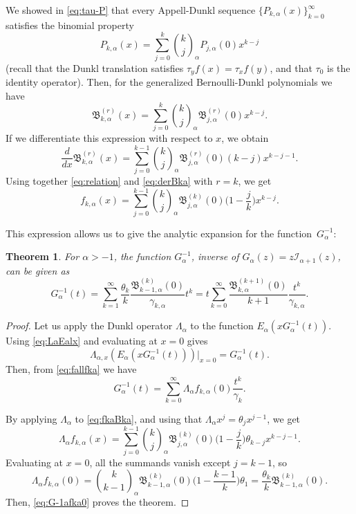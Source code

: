 \documentclass[11pt]{article}
\theoremstyle{plain}
\newtheorem{theorem}{Theorem}[section]
\theoremstyle{remark}
\numberwithin{equation}{section} %
\newcommand{\Ea}{E_{\alpha}}
\newcommand{\La}{\Lambda_{\alpha}}
\newcommand{\Lax}{\Lambda_{\alpha,x}}
\newcommand{\binoma}[2]{\binom{#1}{#2}_{\!\alpha}}
\newcommand{\I}{\mathcal{I}}
\newcommand{\B}{\mathfrak{B}}
\newcommand{\cc}{\gamma}
\begin{document}
We showed in \eqref{eq:tau-P} that every Appell-Dunkl sequence $\{P_{k,\alpha}(x)\}_{k=0}^{\infty}$
satisfies the binomial property 
\[
  P_{k,\alpha}(x) = \sum_{j=0}^k \binoma{k}{j} P_{j,\alpha}(0) x^{k-j}
\]
(recall that the Dunkl translation satisfies $\tau_y f(x) = \tau_x f(y)$, and that $\tau_0$ is the identity operator). Then, for the generalized Bernoulli-Dunkl polynomials we have
\begin{equation*}
\B_{k,\alpha}^{(r)}(x) 
= \sum_{j=0}^k \binoma{k}{j} \B_{j,\alpha}^{(r)}(0) x^{k-j}.
\end{equation*}
If we differentiate this expression with respect to $x$, we obtain
\begin{equation}
\label{eq:derBka}
\frac{d}{dx} \B_{k,\alpha}^{(r)}(x) 
= \sum_{j=0}^{k-1} \binoma{k}{j} \B_{j,\alpha}^{(r)}(0)(k-j)x^{k-j-1}.
\end{equation}
Using together \eqref{eq:relation} and \eqref{eq:derBka} with $r=k$, we get
\begin{equation}
\label{eq:fkaBka}
f_{k,\alpha}(x) = \sum_{j=0}^{k-1} \binoma{k}{j} \B_{j,\alpha}^{(k)}(0) \Big(1-\frac{j}{k}\Big)x^{k-j}.
\end{equation}

This expression allows us to give the analytic expansion for the function~$G_\alpha^{-1}$:

\begin{theorem}
\label{teo:inver-Ga}
For $\alpha>-1$, the function $G^{-1}_\alpha$, inverse of $G_\alpha(z) = z \I_{\alpha+1}(z)$, can be given as
\[
G_{\alpha}^{-1}(t) 
= \sum_{k=1}^{\infty} \frac{\theta_{k}}{k} \frac{\B_{k-1,\alpha}^{(k)}(0)}{\cc_{k,\alpha}}t^k
= t \sum_{k=0}^{\infty} \frac{\B_{k,\alpha}^{(k+1)}(0)}{k+1} \frac{t^k}{\cc_{k,\alpha}}.
\]
\end{theorem}

\begin{proof}
Let us apply the Dunkl operator $\La$ to the function $\Ea(xG_{\alpha}^{-1}(t))$. 
Using \eqref{eq:LaEalx} and evaluating at $x=0$ gives
\[
\Lax(\Ea(xG_{\alpha}^{-1}(t)))\big|_{x=0} = G_{\alpha}^{-1}(t).
\]
Then, from \eqref{eq:fallfka} we have
\begin{equation}
\label{eq:G-1afka0}
G_{\alpha}^{-1}(t) = \sum_{k=0}^{\infty} \La f_{k,\alpha}(0) \frac{t^k}{\cc_k}.
\end{equation}

By applying $\La$ to \eqref{eq:fkaBka}, and using that $\La x^j = \theta_j x^{j-1}$, we get
\[
\La f_{k,\alpha}(x) 
= \sum_{j=0}^{k-1} \binoma{k}{j} \B_{j,\alpha}^{(k)}(0) \Big(1-\frac{j}{k}\Big)
\theta_{k-j}x^{k-j-1}.
\]
Evaluating at $x=0$, all the summands vanish except $j=k-1$, so
\[
\La f_{k,\alpha}(0) = \binoma{k}{k-1} \B_{k-1,\alpha}^{(k)}(0) \Big(1-\frac{k-1}{k}\Big)\theta_{1}
= \frac{\theta_k}{k} \B_{k-1,\alpha}^{(k)}(0).
\]
Then, \eqref{eq:G-1afka0} proves the theorem.
\end{proof}
\end{document}
